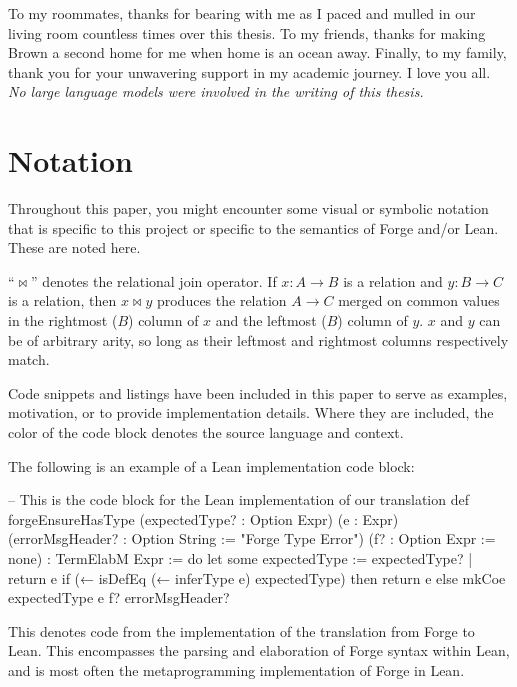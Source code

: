 
To my roommates, thanks for bearing with me as I paced and mulled in our living room countless times over this thesis. To my friends, thanks for making Brown a second home for me when home is an ocean away. Finally, to my family, thank you for your unwavering support in my academic journey. I love you all. \\

\emph{No large language models were involved in the writing of this thesis.}

\newpage
{
  \hypersetup{linkcolor=black}
  \tableofcontents
}

\newpage
\section*{Notation}
Throughout this paper, you might encounter some visual or symbolic notation that is specific to this project or specific to the semantics of Forge and/or Lean. These are noted here. 

``$\bowtie$'' denotes the relational join operator. If $x: A \to B$ is a relation and $y: B \to C$ is a relation, then $x\bowtie y$ produces the relation $A\to C$ merged on common values in the rightmost ($B$) column of $x$ and the leftmost ($B$) column of $y$. $x$ and $y$ can be of arbitrary arity, so long as their leftmost and rightmost columns respectively match. 

Code snippets and listings have been included in this paper to serve as examples, motivation, or to provide implementation details. Where they are included, the color of the code block denotes the source language and context. 

The following is an example of a Lean implementation code block:
\begin{leanimpl}
-- This is the code block for the Lean implementation of our translation
def forgeEnsureHasType (expectedType? : Option Expr) (e : Expr)
    (errorMsgHeader? : Option String := "Forge Type Error") 
    (f? : Option Expr := none) : TermElabM Expr := do
  let some expectedType := expectedType? | return e
  if (← isDefEq (← inferType e) expectedType) then
    return e
  else
    mkCoe expectedType e f? errorMsgHeader?
\end{leanimpl}
This denotes code from the implementation of the translation from Forge to Lean. This encompasses the parsing and elaboration of Forge syntax within Lean, and is most often the metaprogramming implementation of Forge in Lean. 

